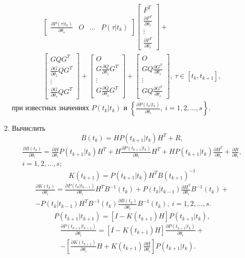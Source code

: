 \documentclass[a4paper,14pt]{extarticle}
\newcommand{\pd}[2]{\frac{\partial #1}{\partial #2}}
\newcommand{\inv}[1]{#1^{-1}}
\begin{document}
\begin{enumerate}
\begin{gather*}
\begin{bmatrix}
		\pd{P(\tau|t_k)}{\theta_s} & O & \ldots & P(\tau|t_k)
	\end{bmatrix}
	\begin{bmatrix}
		F^T \\
		\pd{F^T}{\theta_1} \\
		\vdots \\
		\pd{F^T}{\theta_s}
	\end{bmatrix} + \\
	\begin{bmatrix}
		G Q G^T \\
		\pd{G}{\theta_1} Q G^T \\
		\vdots \\
		\pd{G}{\theta_s} Q G^T 
	\end{bmatrix} +
	\begin{bmatrix}
		O \\
		G \pd{Q}{\theta_1} G^T \\
		\vdots \\
		G \pd{Q}{\theta_s} G^T
	\end{bmatrix} +
	\begin{bmatrix}
		O \\
		G Q \pd{G^T}{\theta_1} \\
		\vdots \\
		G Q \pd{G^T}{\theta_s}
	\end{bmatrix},\ \tau \in [t_k, t_{k+1}],
\end{gather*}
при известных значениях $P(t_k|t_k)$ и
	$\left\{ \pd{P(t_k| t_k)}{\theta_i},\ i = 1,2,\ldots,s \right\}$.

\item Вычислить
	\[
		B(t_k) = H P(t_{k+1}|t_k) H^T + R,
	\]
	\begin{align*}
		\pd{B(t_k)}{\theta_i} = \pd{H}{\theta_i} P(t_{k+1}|t_k) H^T + 
			H \pd{P(t_{k+1}|t_k)}{\theta_i} H^T + H P(t_{k+1}|t_k)
			\pd{H^T}{\theta_i} + \pd{R}{\theta_i}, \\
		i = 1,2,\ldots,s;
	\end{align*}
	\[
		K(t_{k+1}) = P(t_{k+1}|t_k) H^T \inv{B(t_{k+1})}
	\]
	\begin{multline*}
		\pd{K(t_k)}{\theta_i} = \pd{P(t_k|t_{k-1})}{\theta_i} H^T \inv{B}(t_k) +
			P(t_k|t_{k-1}) \pd{H^T}{\theta_i} \inv{B}(t_k) + \\ - P(t_k|t_{k-1}) H^T
			\inv{B}(t_k) \pd{B(t_k)}{\theta_i} \inv{B}(t_k),\ i = 1, 2, \ldots, s.
	\end{multline*}
	\[
		P(t_{k+1}|t_{k+1}) = [ I - K(t_{k+1}) H ] P(t_{k+1}|t_k),
	\]
	\begin{multline*}
		\pd{P(t_{k+1}|t_{k+1})}{\theta_i} =
			[ I - K(t_{k+1}) H ] \pd{P(t_{k+1}|t_k)}{\theta_i} + \\ -
			\left[
				\pd{K(t_{k+1})}{\theta_i} H + K(t_{k+1}) \pd{H}{\theta_i}
			\right]
			P(t_{k+1}|t_k).
	\end{multline*}


\end{enumerate}
\end{document}
